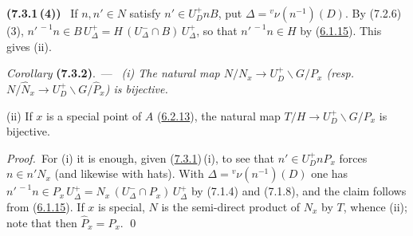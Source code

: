 \documentclass[12pt,a4paper,oneside,english]{smfart}
\makeatletter
\newcommand{\btanchor}[1]{\leavevmode\Hy@raisedlink{\hypertarget{bt:#1}{}}}
\newcommand{\btref}[1]{\hyperlink{bt:#1}{#1}}
\theoremstyle{definition}
\theoremstyle{bt}
\makeatother
\begin{document}
\begingroup\providecommand{\Imm}{}
\renewcommand{\Imm}{\mathscr{I}}
\providecommand{\hImm}{}
\renewcommand{\hImm}{\widehat{\mathscr{I}}}
\providecommand{\hP}{}
\renewcommand{\hP}{\widehat{P}}
\providecommand{\hN}{}
\renewcommand{\hN}{\widehat{N}}
\providecommand{\hW}{}
\renewcommand{\hW}{\widehat{W}}
\providecommand{\vnu}{}
\renewcommand{\vnu}{{}^{v}\nu}
\providecommand{\vW}{}
\renewcommand{\vW}{{}^{v}W}
\providecommand{\vpi}{}
\renewcommand{\vpi}{{}^{v}\pi}
\providecommand{\red}{}
\renewcommand{\red}{\mathrm{red}}
\providecommand{\cl}{}
\renewcommand{\cl}{\operatorname{cl}}
\providecommand{\Card}{}
\renewcommand{\Card}{\operatorname{Card}}
\providecommand{\bU}{}
\renewcommand{\bU}{\overline{U}}
\providecommand{\bT}{}
\renewcommand{\bT}{\overline{T}}
\providecommand{\bB}{}
\renewcommand{\bB}{\overline{B}}
\providecommand{\bG}{}
\renewcommand{\bG}{\overline{G}}
\providecommand{\bu}{}
\renewcommand{\bu}{\overline{u}}
\providecommand{\bw}{}
\renewcommand{\bw}{\overline{w}}
\providecommand{\bD}{}
\renewcommand{\bD}{\overline{D}}
\providecommand{\tE}{}
\renewcommand{\tE}{\widetilde{E}}
\newenvironment{stmt}[2]%
  {\medskip\par\noindent\textit{#1} \textbf{(#2)}.\ ---\ \begingroup\itshape}%
  {\endgroup\par\medskip}
\providecommand{\num}{}
\renewcommand{\num}[1]{\medskip\par\noindent\textbf{(#1)}\ }
\providecommand{\pf}{}
\renewcommand{\pf}{\par\noindent\emph{Proof.}\ }
\setlength{\parindent}{1.4em}
\bigskip

\num{7.3.1\,(4)} If $n,n'\in N$ satisfy $n'\in U_D^{+}nB$, put
$\Delta=\vnu(n^{-1})(D)$. By (7.2.6)\,(3),
$n'^{\,-1}n\in B\,U_\Delta^{+}=H\,(U_\Delta^{-}\cap B)\,U_\Delta^{+}$, so that
$n'^{\,-1}n\in H$ by (\btref{6.1.15}). This gives (ii).

\begin{stmt}{Corollary}{7.3.2}\btanchor{7.3.2}
(i) The natural map $N/N_x\to U_D^{+}\backslash G/P_x$ (resp.\
$N/\hN_x\to U_D^{+}\backslash G/\hP_x$) is bijective.

(ii) If $x$ is a special point of $A$ \textup{(\btref{6.2.13})}, the natural map
$T/H\to U_D^{+}\backslash G/P_x$ is bijective.
\end{stmt}

\pf For (i) it is enough, given (\btref{7.3.1})\,(i), to see that $n'\in U_D^{+}nP_x$
forces $n\in n'N_x$ (and likewise with hats). With $\Delta=\vnu(n^{-1})(D)$ one has
$n'^{\,-1}n\in P_x\,U_\Delta^{+}=N_x\,(U_\Delta^{-}\cap P_x)\,U_\Delta^{+}$ by
(7.1.4) and (7.1.8), and the claim follows from (\btref{6.1.15}). If $x$ is special, $N$ is
the semi-direct product of $N_x$ by $T$, whence (ii); note that then $\hP_x=P_x$.
\qed
\end{document}
